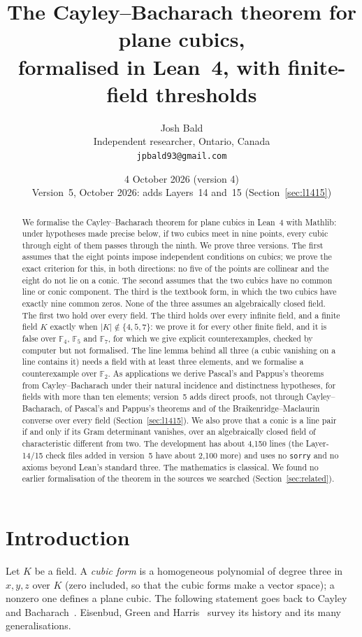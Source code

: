 \documentclass[11pt]{article}
\title{The Cayley--Bacharach theorem for plane cubics,\\ formalised in Lean~4,
with finite-field thresholds}
\author{Josh Bald\\ \small Independent researcher, Ontario, Canada\\ \small\texttt{jpbald93@gmail.com}}
\date{4 October 2026 (version 4)\\ \small Version~5, October 2026: adds Layers~14 and~15 (Section~\ref{sec:l1415})}
\theoremstyle{definition}
\theoremstyle{remark}
\newcommand{\lean}[1]{\texttt{#1}}
\newcommand{\F}{\mathbb{F}}
\begin{document}
\maketitle

\begin{abstract}
We formalise the Cayley--Bacharach theorem for plane cubics in Lean~4 with Mathlib: under hypotheses made precise below, if two
cubics meet in nine points, every cubic through eight of them passes through the ninth. We prove
three versions. The first assumes that the eight points impose independent conditions on cubics;
we prove the exact criterion for this, in both directions: no five of the points are collinear
and the eight do not lie on a conic. The second assumes that the two cubics have no common line
or conic component. The third is the textbook form, in which the two cubics have exactly nine
common zeros. None of the three assumes an algebraically closed field. The first two hold over
every field. The third holds over every infinite field, and a finite field $K$ exactly when
$|K|\notin\{4,5,7\}$: we prove it for every other finite field, and it is false over $\F_4$,
$\F_5$ and $\F_7$, for which we give explicit counterexamples, checked by computer but not
formalised.
The line lemma behind all three (a cubic vanishing on a line contains it) needs a field with at
least three elements, and we formalise a counterexample over $\F_2$. As applications we derive
Pascal's and Pappus's theorems from Cayley--Bacharach under their natural incidence and
distinctness hypotheses, for fields with more than ten elements; version~5 adds direct proofs,
not through Cayley--Bacharach, of Pascal's and Pappus's theorems and of the Braikenridge--Maclaurin
converse over every field (Section~\ref{sec:l1415}). We also
prove that a conic is a line pair if and only if its Gram determinant vanishes, over an
algebraically closed field of characteristic different from two. The development has about
4{,}150 lines (the Layer-14/15 check files added in version~5 have about 2{,}100 more) and uses no \lean{sorry} and no axioms beyond Lean's standard three. The
mathematics is classical. We found no earlier formalisation of the theorem in the sources we
searched (Section~\ref{sec:related}).
\end{abstract}

\section{Introduction}

Let $K$ be a field. A \emph{cubic form} is a homogeneous polynomial of degree three in $x,y,z$ over $K$ (zero
included, so that the cubic forms make a vector space); a nonzero one defines a plane cubic. The following statement goes back to Cayley~\cite{Cayley} and
Bacharach~\cite{Bacharach}. Eisenbud, Green and Harris~\cite{EGH} survey its history and its
many generalisations.
\end{document}
